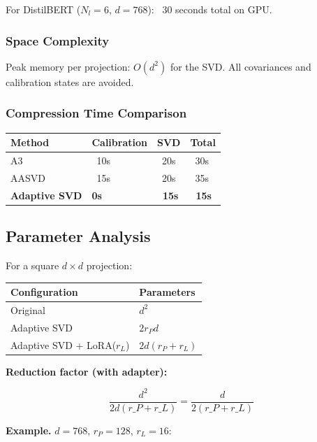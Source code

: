 For DistilBERT ($N_l = 6$, $d = 768$): ~30 seconds total on GPU.

\subsubsection{Space Complexity}

Peak memory per projection: $O(d^2)$ for the SVD. All covariances 
and calibration states are avoided.

\subsubsection{Compression Time Comparison}

\begin{table}[H]
\centering
\small
\begin{tabular}{llll}
\toprule
\textbf{Method} & \textbf{Calibration} & \textbf{SVD} & \textbf{Total} \\
\midrule
A3 & ~10s & ~20s & ~30s \\
AASVD & ~15s & ~20s & ~35s \\
\textbf{Adaptive SVD} & \textbf{0s} & \textbf{~15s} & \textbf{~15s} \\
\bottomrule
\end{tabular}
\end{table}

\subsection{Parameter Analysis}

For a square $d \times d$ projection:

\begin{table}[H]
\centering
\small
\begin{tabular}{ll}
\toprule
\textbf{Configuration} & \textbf{Parameters} \\
\midrule
Original & $d^2$ \\
Adaptive SVD & $2 r_P d$ \\
Adaptive SVD + LoRA($r_L$) & $2 d (r_P + r_L)$ \\
\bottomrule
\end{tabular}
\end{table}

\textbf{Reduction factor (with adapter):}

\[
\frac{d^2}{2 d (r\_P + r\_L)} = \frac{d}{2(r\_P + r\_L)}
\tag{4.10}
\]

\textbf{Example.} $d = 768$, $r_P = 128$, $r_L = 16$:


